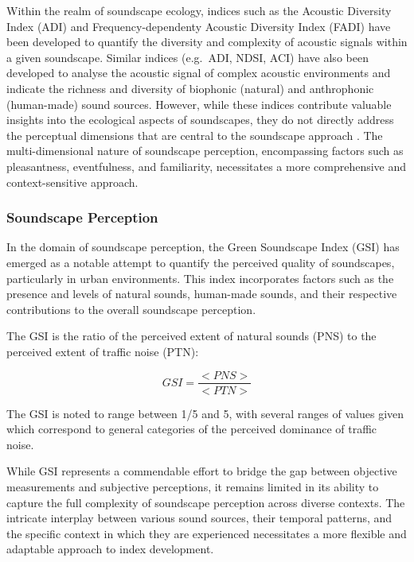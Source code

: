 \documentclass[
  authoryear,
  preprint,
  3p]{elsarticle}
\begin{document}
Within the realm of soundscape ecology, indices such as the Acoustic
Diversity Index (ADI) and Frequency-dependenty Acoustic Diversity Index
(FADI) \citep{Xu2023frequency} have been developed to quantify the
diversity and complexity of acoustic signals within a given soundscape.
Similar indices (e.g.~ADI, NDSI, ACI) have also been developed to
analyse the acoustic signal of complex acoustic environments and
indicate the richness and diversity of biophonic (natural) and
anthrophonic (human-made) sound sources. However, while these indices
contribute valuable insights into the ecological aspects of soundscapes,
they do not directly address the perceptual dimensions that are central
to the soundscape approach \citep{SchulteFortkamp2023Soundscapes}. The
multi-dimensional nature of soundscape perception, encompassing factors
such as pleasantness, eventfulness, and familiarity, necessitates a more
comprehensive and context-sensitive approach.

\subsubsection{Soundscape Perception}\label{soundscape-perception}

In the domain of soundscape perception, the Green Soundscape Index (GSI)
\citep{Kogan2018Green} has emerged as a notable attempt to quantify the
perceived quality of soundscapes, particularly in urban environments.
This index incorporates factors such as the presence and levels of
natural sounds, human-made sounds, and their respective contributions to
the overall soundscape perception.

The GSI is the ratio of the perceived extent of natural sounds (PNS) to
the perceived extent of traffic noise (PTN):

\[
GSI = \frac{<PNS>}{<PTN>}
\]

The GSI is noted to range between 1/5 and 5, with several ranges of
values given which correspond to general categories of the perceived
dominance of traffic noise.

While GSI represents a commendable effort to bridge the gap between
objective measurements and subjective perceptions, it remains limited in
its ability to capture the full complexity of soundscape perception
across diverse contexts. The intricate interplay between various sound
sources, their temporal patterns, and the specific context in which they
are experienced necessitates a more flexible and adaptable approach to
index development.
\end{document}
